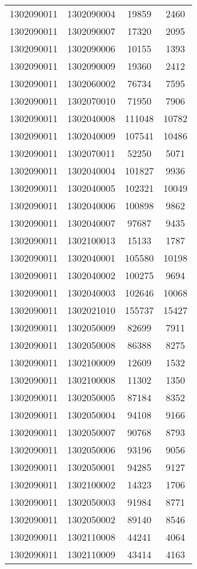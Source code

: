 \begin{longtable}[h]{llcc}
		1302090011 & 1302090004 & 19859 & 2460\\
		1302090011 & 1302090007 & 17320 & 2095\\
		1302090011 & 1302090006 & 10155 & 1393\\
		1302090011 & 1302090009 & 19360 & 2412\\
		1302090011 & 1302060002 & 76734 & 7595\\
		1302090011 & 1302070010 & 71950 & 7906\\
		1302090011 & 1302040008 & 111048 & 10782\\
		1302090011 & 1302040009 & 107541 & 10486\\
		1302090011 & 1302070011 & 52250 & 5071\\
		1302090011 & 1302040004 & 101827 & 9936\\
		1302090011 & 1302040005 & 102321 & 10049\\
		1302090011 & 1302040006 & 100898 & 9862\\
		1302090011 & 1302040007 & 97687 & 9435\\
		1302090011 & 1302100013 & 15133 & 1787\\
		1302090011 & 1302040001 & 105580 & 10198\\
		1302090011 & 1302040002 & 100275 & 9694\\
		1302090011 & 1302040003 & 102646 & 10068\\
		1302090011 & 1302021010 & 155737 & 15427\\
		1302090011 & 1302050009 & 82699 & 7911\\
		1302090011 & 1302050008 & 86388 & 8275\\
		1302090011 & 1302100009 & 12609 & 1532\\
		1302090011 & 1302100008 & 11302 & 1350\\
		1302090011 & 1302050005 & 87184 & 8352\\
		1302090011 & 1302050004 & 94108 & 9166\\
		1302090011 & 1302050007 & 90768 & 8793\\
		1302090011 & 1302050006 & 93196 & 9056\\
		1302090011 & 1302050001 & 94285 & 9127\\
		1302090011 & 1302100002 & 14323 & 1706\\
		1302090011 & 1302050003 & 91984 & 8771\\
		1302090011 & 1302050002 & 89140 & 8546\\
		1302090011 & 1302110008 & 44241 & 4064\\
		1302090011 & 1302110009 & 43414 & 4163\\

\end{longtable}
